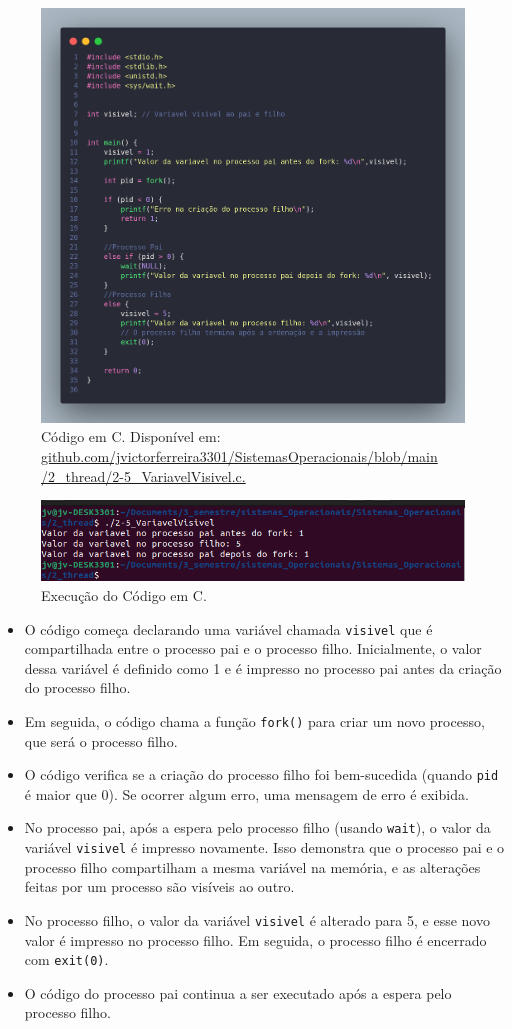 \documentclass[
	12pt,				%
	openright,			%
	oneside,			%
	a4paper,			%
	chapter=TITLE,		%
	english,			%
	french,				%
	spanish,			%
	brazil				%
	]{abntex2}
\theoremstyle{definition}
\begin{document}
\begin{figure}
    \centering
    \includegraphics[width=0.6 \textwidth]{imagens/processos_5.png}
    \caption{Código em C. Disponível em: \href{https://github.com/jvictorferreira3301/Sistemas_Operacionais/blob/main/2_thread/2-5_VariavelVisivel.c}{github.com/jvictorferreira3301/SistemasOperacionais/blob/main
    /2\_thread/2-5\_VariavelVisivel.c.}}
    \label{fig:proc5}
\end{figure}

\begin{figure}
    \centering
    \includegraphics[width=0.7 \textwidth]{imagens/run_processos_5.png}
    \caption{Execução do Código em C.}
    \label{fig:run5}
\end{figure}

\begin{itemize}
    \item O código começa declarando uma variável chamada \texttt{visivel} que é compartilhada entre o processo pai e o processo filho. Inicialmente, o valor dessa variável é definido como 1 e é impresso no processo pai antes da criação do processo filho.
    \item Em seguida, o código chama a função \texttt{fork()} para criar um novo processo, que será o processo filho.
    \item O código verifica se a criação do processo filho foi bem-sucedida (quando \texttt{pid} é maior que 0). Se ocorrer algum erro, uma mensagem de erro é exibida.
    \item No processo pai, após a espera pelo processo filho (usando \texttt{wait}), o valor da variável \texttt{visivel} é impresso novamente. Isso demonstra que o processo pai e o processo filho compartilham a mesma variável na memória, e as alterações feitas por um processo são visíveis ao outro.
    \item No processo filho, o valor da variável \texttt{visivel} é alterado para 5, e esse novo valor é impresso no processo filho. Em seguida, o processo filho é encerrado com \texttt{exit(0)}.
    \item O código do processo pai continua a ser executado após a espera pelo processo filho.
\end{itemize}
\end{document}
